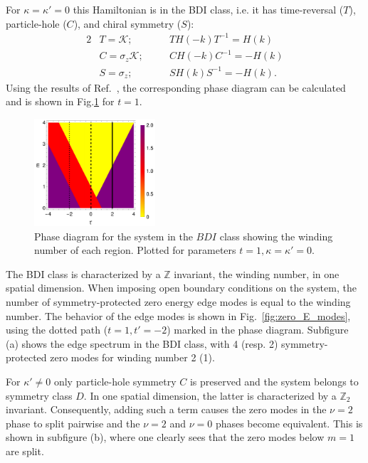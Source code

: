\documentclass[twocolumn,amsmath,longbibliography,amssymb,superscriptaddress]{revtex4-1}
\begin{document}
For $\kappa = \kappa' = 0$ this Hamiltonian is in the BDI class, i.e. it has time-reversal ($T$), particle-hole ($C$), and chiral symmetry ($S$):
\begin{alignat}{2}
&T = \mathcal{K} ; \quad &&T H(-k) T^{-1} = H(k) \nonumber\\
&C = \sigma_z\mathcal{K} ; \quad &&C H(-k) C^{-1} = -H(k) \nonumber\\
&S = \sigma_z ; \quad &&S H(k)S^{-1} = -H(k) .
\end{alignat}
Using the results of Ref.~\cite{Song2014}, the corresponding phase diagram can be calculated and is shown in Fig.\ref{fig:bdi_phase_diagram} for $t=1$. 
\begin{figure}[t]
	\centering
	\includegraphics[width=45mm]{phase_diagram2.pdf}
	\caption{Phase diagram for the system in the $BDI$ class showing the winding number of each region. Plotted for parameters $t = 1,\kappa =\kappa'=0.$}
\label{fig:bdi_phase_diagram}
\end{figure}
The BDI class  is characterized by a $\mathbb{Z}$ invariant, the winding number,  in one spatial dimension.
When imposing open boundary conditions on the system, the number of symmetry-protected zero energy edge modes is equal to the winding number. 
The behavior of the  edge modes  is  shown in Fig.~\ref{fig:zero_E_modes}, using the dotted path ($t=1,t'=-2$) marked in the phase diagram. 
Subfigure (a) shows the edge spectrum in the BDI class, with 4 (resp. 2) symmetry-protected zero modes for winding number 2 (1). 

For $\kappa' \neq 0$ only particle-hole symmetry $C$ is preserved and the system belongs to symmetry class $D$. 
In one spatial dimension, the latter is characterized by a $\mathbb{Z}_2$ invariant.  
Consequently, adding such a term causes the zero modes in the $\nu=2$ phase to split  pairwise and the $\nu = 2$ and $\nu=0$ phases become equivalent. 
This is shown in subfigure (b), where one clearly sees that the zero modes below $m=1$ are split. 
\end{document}

